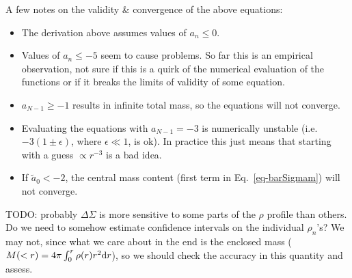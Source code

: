 \documentclass{article}
\begin{document}
A few notes on the validity \& convergence of the above equations:
\begin{itemize}
  \item The derivation above assumes values of $a_n \leq 0$.
  \item Values of $a_n \leq -5$ seem to cause problems. So far this is an empirical observation, not sure if this is a quirk of the numerical evaluation of the functions or if it breaks the limits of validity of some equation.
  \item $a_{N-1} \geq -1$ results in infinite total mass, so the equations will not converge.
  \item Evaluating the equations with $a_{N-1} = -3$ is numerically unstable (i.e. $-3(1\pm\epsilon)$, where $\epsilon \ll 1$, is ok). In practice this just means that starting with a guess $\propto r^{-3}$ is a bad idea.
  \item If $\tilde{a}_0 < -2$, the central mass content (first term in Eq.~\ref{eq-barSigmam}) will not converge.
\end{itemize}

TODO: probably $\Delta\Sigma$ is more sensitive to some parts of the $\rho$ profile than others. Do we need to somehow estimate confidence intervals on the individual $\rho_n$'s? We may not, since what we care about in the end is the enclosed mass ($M(<r)=4\pi\int_0^r\rho(r)r^2{\rm d}r$), so we should check the accuracy in this quantity and assess.
\end{document}

